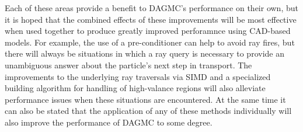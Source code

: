 \documentclass[12pt, a4paper]{article}
\begin{document}
Each of these areas provide a benefit to DAGMC's performance on their own, but it is hoped that the combined effects of these improvements will be most effective when used together to produce greatly improved perforamnce using CAD-based models. For example, the use of a pre-conditioner can help to avoid ray fires, but there will always be situations in which a ray query is necessary to provide an unambiguous answer about the particle's next step in transport. The improvements to the underlying ray traversals via SIMD and a specialized building algorithm for handling of high-valance regions will also alleviate performance issues when these situations are encountered. At the same time it can also be stated that the application of any of these methods individually will also improve the performance of DAGMC to some degree. 


\end{document}
